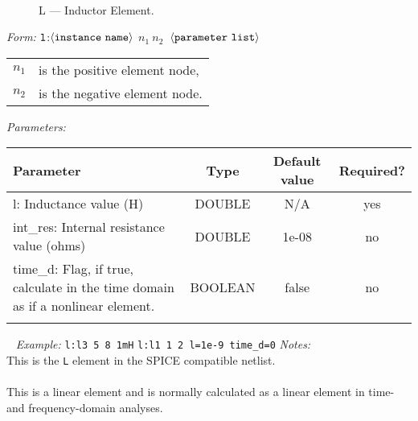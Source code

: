 \documentclass{article}
\begin{document}
\\
\myThickLine
\normalsize
\newline
\begin{figure}[h]
\centerline{\epsfxsize=1in} \caption{L ---
Inductor Element.}
\end{figure}
\newline
\myThickLine
\newline
\textit{Form:}
\newline
$\tt l$:$\langle \tt{instance\ name}\rangle$ $n_1\ n_2\ $
$\langle \tt{parameter\ list}\rangle$
\newline
\begin{tabular}{r l}
$n_1$ & is the positive element node, \\
$n_2$ & is the negative element node. \\
\end{tabular}
\medskip
\newline
\textit{Parameters:}
\begin{table}[H]
\begin{tabular}{|p{3in}|c|c|c|}
\hline
Parameter&Type&Default value&Required?\\
\hline
l: Inductance value (H)& DOUBLE & N/A & yes\\
\hline
int\_res: Internal resistance value (ohms) & DOUBLE & 1e-08 & no\\
\hline
time\_d: Flag, if true, calculate in the time domain as if a nonlinear element. & BOOLEAN & false & no\\
\par
\hline
\end{tabular}
\end{table}
~
\myThickLine
\textit{Example:}
\newline
\texttt{l:l3\ 5\ 8\ 1mH}
\newline
\texttt{l:l1\ 1\ 2\ l=1e-9 time\_d=0}
\newline
\myThickLine
\newline
\textit{Notes:}\\
This is the \texttt{L} element in the SPICE compatible netlist.\\\\
This is  a linear element and is normally calculated as a linear element in time- and frequency-domain analyses.\\\\
\end{document}
